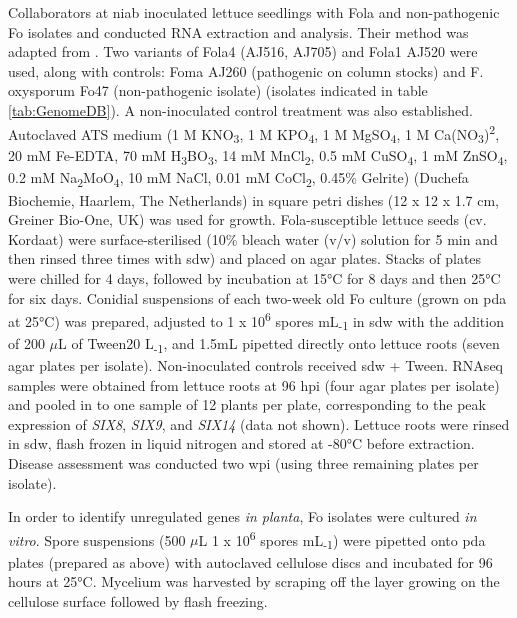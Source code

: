 Collaborators at \ac{niab} inoculated lettuce seedlings with \ac{Fola} and non-pathogenic \ac{Fo} isolates and conducted RNA extraction and analysis. Their method was adapted from \textcite{Taylor2016}. Two variants of Fola4 (AJ516, AJ705) and Fola1 AJ520 were used, along with controls: Foma AJ260 (pathogenic on column stocks) and F. oxysporum Fo47 (non-pathogenic isolate) (isolates indicated in table \ref{tab:GenomeDB}). A non-inoculated control treatment was also established. Autoclaved ATS medium (1 M KNO\textsubscript{3}, 1 M KPO\textsubscript{4}, 1 M MgSO\textsubscript{4}, 1 M Ca(NO\textsubscript{3})\textsuperscript{2}, 20 mM Fe-EDTA, 70 mM H\textsubscript{3}BO\textsubscript{3}, 14 mM MnCl\textsubscript{2}, 0.5 mM CuSO\textsubscript{4}, 1 mM ZnSO\textsubscript{4}, 0.2 mM Na\textsubscript{2}MoO\textsubscript{4}, 10 mM NaCl, 0.01 mM CoCl\textsubscript{2}, 0.45\% Gelrite) (Duchefa Biochemie, Haarlem, The Netherlands) in square petri dishes (12 x 12 x 1.7 cm, Greiner Bio-One, UK) was used for growth. \ac{Fola}-susceptible lettuce seeds (cv. Kordaat) were surface-sterilised (10\% bleach water (v/v) solution for 5 min and then rinsed three times with \ac{sdw}) and placed on agar plates. Stacks of plates were chilled for 4 days, followed by incubation at 15°C for 8 days and then 25°C for six days. Conidial suspensions of each two-week old \ac{Fo} culture (grown on \ac{pda} at 25°C) was prepared, adjusted to 1 x 10\textsuperscript{6} spores mL\textsubscript{-1} in \ac{sdw} with the addition of 200 \(\mu\)L of Tween20 L\textsubscript{-1}, and 1.5mL pipetted directly onto lettuce roots (seven agar plates per isolate). Non-inoculated controls received \ac{sdw} + Tween. RNAseq samples were obtained from lettuce roots at 96 \ac{hpi} (four agar plates per isolate) and pooled in to one sample of 12 plants per plate, corresponding to the peak expression of \textit{SIX8}, \textit{SIX9}, and \textit{SIX14} (data not shown). Lettuce roots were rinsed in \ac{sdw}, flash frozen in liquid nitrogen and stored at -80°C before extraction. Disease assessment was conducted two \ac{wpi} (using three remaining plates per isolate).

In order to identify unregulated genes \textit{in planta}, \ac{Fo} isolates were cultured \textit{in vitro}. Spore suspensions (500 \(\mu\)L 1 x 10\textsuperscript{6} spores mL\textsubscript{-1}) were pipetted onto \ac{pda} plates (prepared as above) with autoclaved cellulose discs and incubated for 96 hours at 25°C. Mycelium was harvested by scraping off the layer growing on the cellulose surface followed by flash freezing. 

